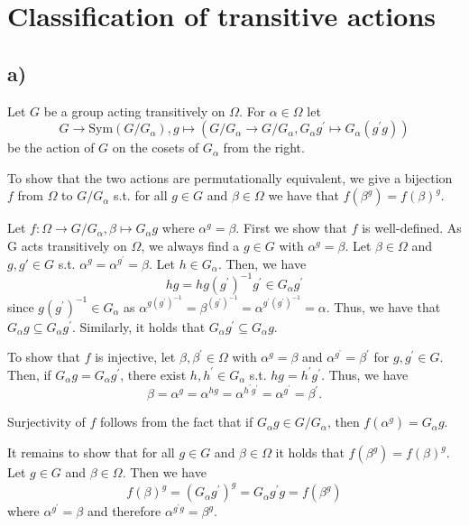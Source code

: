 \section{Classification of transitive actions}
\subsection*{a)}
Let $G$ be a group acting transitively on $\Omega$. For $\alpha \in \Omega$ let
\[ G \rightarrow \text{Sym}(G/G_\alpha), g \mapsto (G/G_\alpha \rightarrow G/G_\alpha, G_\alpha g^\prime \mapsto G_\alpha (g^\prime g)) \]
be the action of $G$ on the cosets of $G_\alpha$ from the right.

To show that the two actions are permutationally equivalent, we give a bijection $f$ from $\Omega$ to $G/G_\alpha$ s.t. for all $g \in G$ and $\beta \in \Omega$ we have that $f(\beta^g) = f(\beta)^g$.

Let $f : \Omega \rightarrow G/G_\alpha, \beta \mapsto G_\alpha g$ where $\alpha^g = \beta$. First we show that $f$ is well-defined. As G acts transitively on $\Omega$, we always find a $g \in G$ with $\alpha^g = \beta$. Let $\beta \in \Omega$ and $g, g\prime \in G$ s.t. $\alpha^g = \alpha^{g^\prime} = \beta$. Let $h \in G_\alpha$. Then, we have
\[ h g = h g (g^\prime)^{-1} g^\prime \in G_\alpha g^\prime \]
since $g (g^\prime)^{-1} \in G_\alpha$ as $\alpha^{g (g^\prime)^{-1}} = \beta^{(g^\prime)^{-1}} = \alpha^{g^\prime (g^\prime)^{-1}} = \alpha$. Thus, we have that $G_\alpha g \subseteq G_\alpha g^\prime$. Similarly, it holds that $G_\alpha g^\prime \subseteq G_\alpha g$.

To show that $f$ is injective, let $\beta, \beta^\prime \in \Omega$ with $\alpha^g = \beta$ and $\alpha^{g^\prime} = \beta^\prime$ for $g, g^\prime \in G$. Then, if $G_\alpha g = G_\alpha g^\prime$, there exist $h, h^\prime \in G_\alpha$ s.t. $h g = h^\prime g^\prime$. Thus, we have
\[ \beta = \alpha^g = \alpha^{h g} = \alpha^{h^\prime g^\prime} = \alpha^{g^\prime} = \beta^\prime. \]

Surjectivity of $f$ follows from the fact that if $G_\alpha g \in G/G_\alpha$, then $f(\alpha^g) = G_\alpha g$.

It remains to show that for all $g \in G$ and $\beta \in \Omega$ it holds that $f(\beta^g) = f(\beta)^g$. Let $g \in G$ and $\beta \in \Omega$. Then we have
\[ f(\beta)^g = (G_\alpha g^\prime)^g = G_\alpha g^\prime g = f(\beta^g) \]
where $\alpha^{g^\prime} = \beta$ and therefore $\alpha^{g^\prime g} = \beta^g$.

